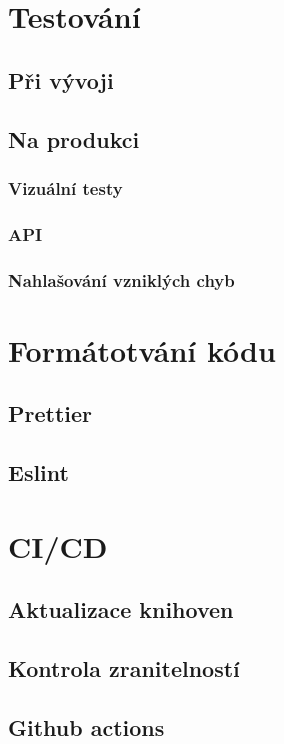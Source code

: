 \documentclass[12pt, a4paper,
 twoside,        %
 openright
]{report}
\begin{document}
\section{Testování}
\subsection{Při vývoji}  

\subsection{Na produkci} 
\subsubsection{Vizuální testy}
\subsubsection{API}
\subsubsection{Nahlašování vzniklých chyb}


 
\section{Formátotvání kódu}  
\subsection{Prettier}
\subsection{Eslint}


\section{CI/CD}
\subsection{Aktualizace knihoven}
\subsection{Kontrola zranitelností}
\subsection{Github actions} 




 
\end{document}
